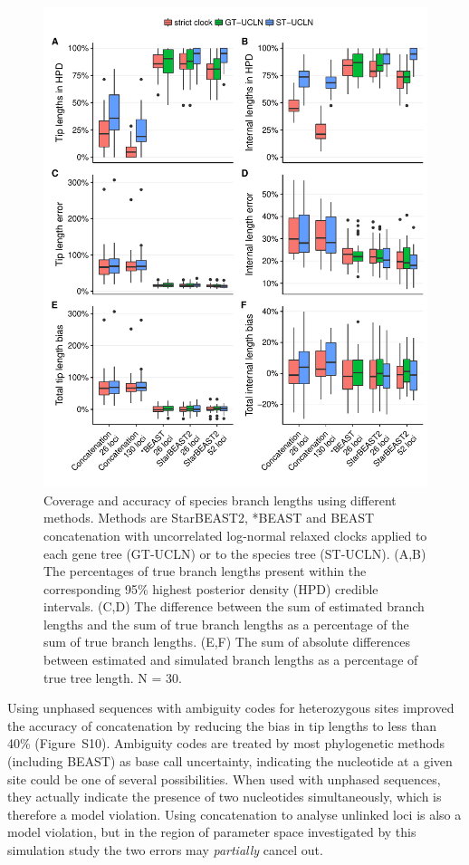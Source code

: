 \documentclass[nogrid]{MBE}%
\begin{document}
\begin{figure}[htb!]
\centering
\includegraphics[width=130mm]{branch_length_accuracy_phased.pdf}
\caption
{Coverage and accuracy of species branch lengths using different methods.
Methods are StarBEAST2, *BEAST and BEAST concatenation with uncorrelated
log-normal relaxed clocks applied to each gene tree (GT-UCLN) or to the species
tree (ST-UCLN). (A,B) The percentages of true branch lengths present within the
corresponding 95\% highest posterior density (HPD) credible intervals. (C,D)
The difference between the sum of estimated branch lengths and the sum of true
branch lengths as a percentage of the sum of true branch lengths. (E,F) The
sum of absolute differences between estimated and simulated branch lengths as
a percentage of true tree length. N = 30.}
\label{fig:branchLengthsError}
\end{figure}

Using unphased sequences with ambiguity codes for heterozygous sites improved
the accuracy of concatenation by reducing the bias in tip lengths to less than
40\% (Figure~S10). Ambiguity codes are treated by most
phylogenetic methods (including BEAST) as base call uncertainty,
indicating the nucleotide at a given site could be one of several
possibilities. When used with unphased sequences, they actually indicate the
presence of two nucleotides simultaneously, which is therefore a model violation.
Using concatenation to analyse unlinked loci is also a model violation, but in
the region of parameter space investigated by this simulation study the two
errors may \textit{partially} cancel out.
\end{document}
